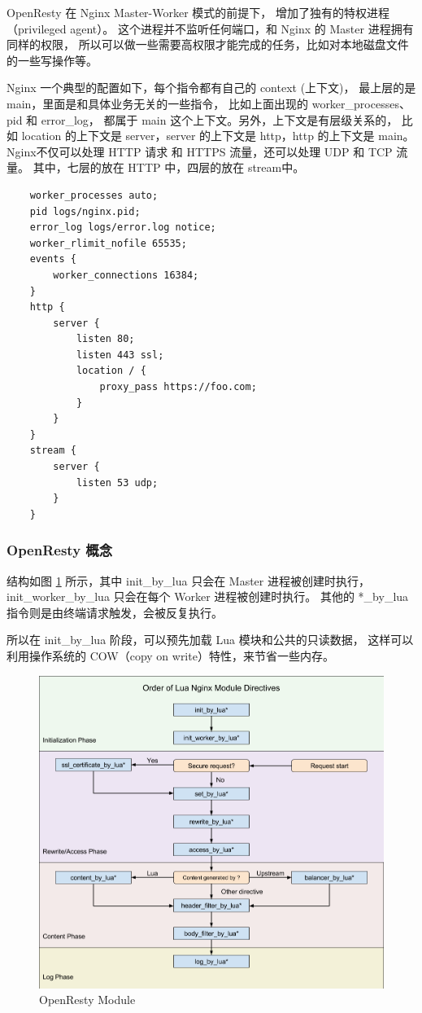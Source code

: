\documentclass[a4,10pt]{ctexart}
\begin{document}
OpenResty 在 Nginx Master-Worker 模式的前提下，
增加了独有的特权进程（privileged agent）。
这个进程并不监听任何端口，和 Nginx 的 Master 进程拥有同样的权限，
所以可以做一些需要高权限才能完成的任务，比如对本地磁盘文件的一些写操作等。

Nginx 一个典型的配置如下，每个指令都有自己的 context (上下文)，
最上层的是 main，里面是和具体业务无关的一些指令，
比如上面出现的 worker\_processes、pid 和 error\_log，
都属于 main 这个上下文。另外，上下文是有层级关系的，
比如 location 的上下文是 server，server 的上下文是 http，http 的上下文是 main。
Nginx不仅可以处理 HTTP 请求 和 HTTPS 流量，还可以处理 UDP 和 TCP 流量。
其中，七层的放在 HTTP 中，四层的放在 stream中。
\begin{verbatim}
	worker_processes auto;
	pid logs/nginx.pid;
	error_log logs/error.log notice;
	worker_rlimit_nofile 65535;
	events {
		worker_connections 16384;
	}
	http {
		server {
			listen 80;
			listen 443 ssl;
			location / {
				proxy_pass https://foo.com;
			}
		}
	}
	stream {
		server {
			listen 53 udp;
		}
	}
\end{verbatim}

\subsubsection{OpenResty 概念}

结构如图 \ref{key5} 所示，其中 init\_by\_lua 只会在 Master 进程被创建时执行，
init\_worker\_by\_lua 只会在每个 Worker 进程被创建时执行。
其他的 *\_by\_lua 指令则是由终端请求触发，会被反复执行。

所以在 init\_by\_lua 阶段，可以预先加载 Lua 模块和公共的只读数据，
这样可以利用操作系统的 COW（copy on write）特性，来节省一些内存。

\begin{figure}[htbp]
	\centering
	\includegraphics[width=.6\textwidth]{img/nginx/nginx_module.png}
	\caption{OpenResty Module}
	\label{key5}
\end{figure}
\end{document}
